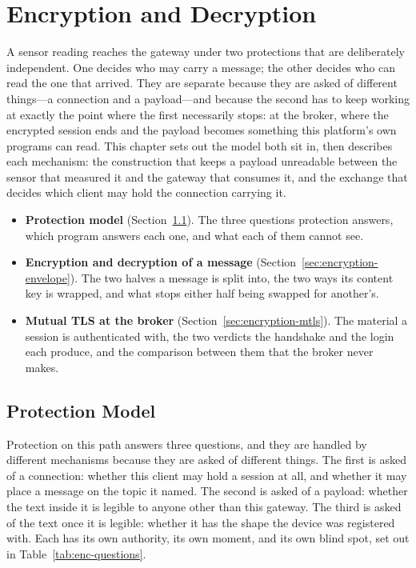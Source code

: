 \documentclass[12pt,a4paper]{report}
\begin{document}
\chapter{Encryption and Decryption}
\label{ch:encryption}

A sensor reading reaches the gateway under two protections that are
deliberately independent. One decides who may carry a message; the other
decides who can read the one that arrived. They are separate because they
are asked of different things---a connection and a payload---and because
the second has to keep working at exactly the point where the first
necessarily stops: at the broker, where the encrypted session ends and the
payload becomes something this platform's own programs can read. This
chapter sets out the model both sit in, then describes each mechanism: the
construction that keeps a payload unreadable between the sensor that measured
it and the gateway that consumes it, and the exchange that decides which
client may hold the connection carrying it.

\begin{itemize}
    \item \textbf{Protection model}
    (Section~\ref{sec:encryption-model}).
    The three questions protection answers, which program answers each one,
    and what each of them cannot see.
    \item \textbf{Encryption and decryption of a message}
    (Section~\ref{sec:encryption-envelope}).
    The two halves a message is split into, the two ways its content key is
    wrapped, and what stops either half being swapped for another's.
    \item \textbf{Mutual TLS at the broker}
    (Section~\ref{sec:encryption-mtls}).
    The material a session is authenticated with, the two verdicts the
    handshake and the login each produce, and the comparison between them
    that the broker never makes.
\end{itemize}

\section{Protection Model}
\label{sec:encryption-model}

Protection on this path answers three questions, and they are handled by
different mechanisms because they are asked of different things. The first
is asked of a connection: whether this client may hold a session at all,
and whether it may place a message on the topic it named. The second is
asked of a payload: whether the text inside it is legible to anyone other
than this gateway. The third is asked of the text once it is legible:
whether it has the shape the device was registered with. Each has its own
authority, its own moment, and its own blind spot, set out in
Table~\ref{tab:enc-questions}.
\end{document}
